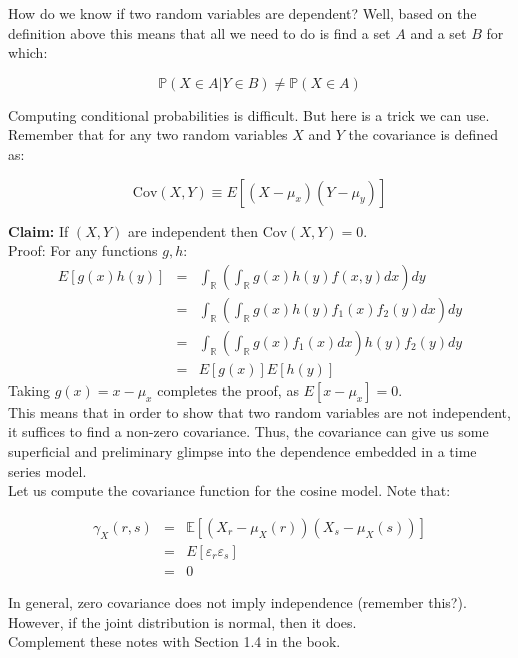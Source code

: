 \documentclass[12] {article}
\begin{document}
How do we know if two random variables are dependent? Well, based on the definition above this means that all we need to do is find a set $A$ and a set $B$ for which:

\[ \mathbb{P}(X \in A | Y \in B) \neq \mathbb{P}(X \in A) \]

Computing conditional probabilities is difficult. But here is a trick we can use. Remember that for any two random variables $X$ and $Y$ the covariance is defined as:

\[ \textrm{Cov}(X,Y) \equiv E [ (X-\mu_x)(Y-\mu_y) ]  \]


\noindent \textbf{Claim:} If $(X, Y)$ are independent then $\textrm{Cov}(X,Y)=0$.  \\


\noindent Proof: For any functions $g,h$:\\
\begin{eqnarray*}
E[ g(x) h(y) ] &=& \int_{\mathbb{R}} \left( \int_{\mathbb{R}} g(x) h(y) f(x,y) dx \right) dy \\
&=& \int_{\mathbb{R}} \left( \int_{\mathbb{R}} g(x) h(y) f_1(x) f_{2}(y) dx \right) dy \\
&=& \int_{\mathbb{R}} \left( \int_{\mathbb{R}} g(x)  f_1(x)  dx \right) h(y) f_{2}(y) dy \\
&=& E[ g(x) ] E[h(y)]
\end{eqnarray*}
Taking $g(x)=x -\mu_x$ completes the proof, as $E[x-\mu_x]=0$.  \\


This means that in order to show that two random variables are not independent, it suffices to find a non-zero covariance. Thus, the covariance can give us some superficial and preliminary glimpse into the dependence embedded in a time series model.  \\


	
Let us compute the covariance function for the cosine model. Note that:

\begin{eqnarray*}
\gamma_{X} (r,s) &=& \mathbb{E}  [ (X_r - \mu_X(r)) (X_s - \mu_X(s))    ]   \\
&=& E [ \varepsilon_{r} \varepsilon_s ] \\
&=& 0
\end{eqnarray*}

In general, zero covariance does not imply independence (remember this?). However, if the joint distribution is normal, then it does. \\

Complement these notes with Section 1.4 in the book. 
\end{document}
